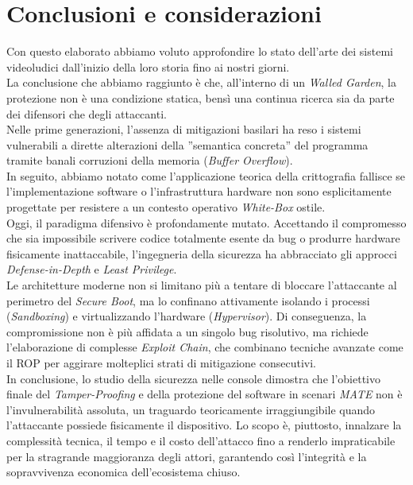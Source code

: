 \section{Conclusioni e considerazioni}
\hspace*{\parindent}Con questo elaborato abbiamo voluto approfondire lo stato dell'arte dei sistemi videoludici dall'inizio della loro storia fino ai nostri giorni.\\
La conclusione che abbiamo raggiunto è che, all'interno di un \textit{Walled Garden}, la protezione non è una condizione statica, bensì una continua ricerca sia da parte dei difensori che degli attaccanti.\\
Nelle prime generazioni, l'assenza di mitigazioni basilari ha reso i sistemi vulnerabili a dirette alterazioni della ''semantica concreta'' del programma tramite banali corruzioni 
della memoria (\textit{Buffer Overflow}).\\ 
In seguito, abbiamo notato come l'applicazione teorica della crittografia fallisce se l'implementazione software o l'infrastruttura hardware non sono esplicitamente progettate per resistere a un contesto operativo \textit{White-Box} ostile.\\
\hspace*{\parindent}Oggi, il paradigma difensivo è profondamente mutato. Accettando il compromesso che sia impossibile scrivere codice totalmente esente da bug o produrre hardware fisicamente inattaccabile, 
l'ingegneria della sicurezza ha abbracciato gli approcci \textit{Defense-in-Depth} e \textit{Least Privilege}.\\
Le architetture moderne non si limitano più a tentare di bloccare l'attaccante al perimetro del \textit{Secure Boot}, ma lo confinano attivamente isolando i processi (\textit{Sandboxing}) e virtualizzando l'hardware (\textit{Hypervisor}). 
Di conseguenza, la compromissione non è più affidata a un singolo bug risolutivo, ma richiede l'elaborazione di complesse \textit{Exploit Chain}, che combinano tecniche avanzate come il ROP per aggirare molteplici strati di mitigazione consecutivi.\\
\hspace*{\parindent}In conclusione, lo studio della sicurezza nelle console dimostra che l'obiettivo finale del \textit{Tamper-Proofing} e della protezione del software in scenari \textit{MATE} non è l'invulnerabilità assoluta, un traguardo teoricamente irraggiungibile 
quando l'attaccante possiede fisicamente il dispositivo. Lo scopo è, piuttosto, innalzare la complessità tecnica, il tempo e il costo dell'attacco fino a renderlo impraticabile per la stragrande maggioranza degli attori, garantendo così l'integrità e la sopravvivenza economica dell'ecosistema chiuso.